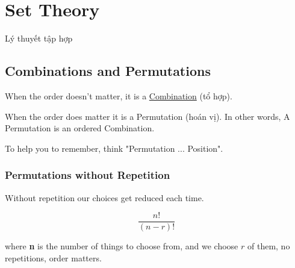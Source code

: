 \chapter{Set Theory}

Lý thuyết tập hợp

\section{Combinations and Permutations}

When the order doesn't matter, it is a \href{https://en.wikipedia.org/wiki/Combination}{Combination} (tổ hợp).

When the order does matter it is a Permutation (hoán vị). In other words, A Permutation is an ordered Combination.

To help you to remember, think "Permutation ... Position".

\subsection{Permutations without Repetition}

Without repetition our choices get reduced each time.

\begin{equation}
  \frac{n!}{(n-r)!}
  \label{eq:permutation-no-repeat}
\end{equation}

where \textbf{n} is the number of things to choose from, and we choose \(r\) of them, no repetitions, order matters.
